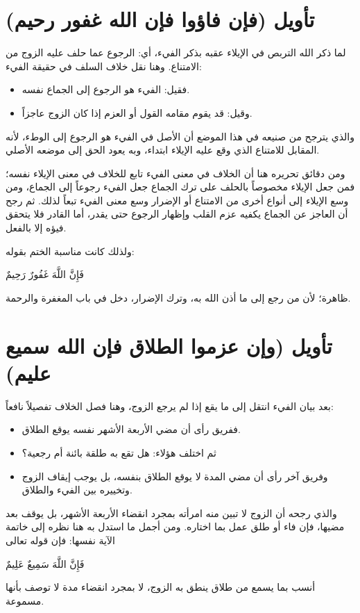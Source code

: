 \section{تأويل (فإن فاؤوا فإن الله غفور رحيم)}
لما ذكر الله التربص في الإيلاء عقبه بذكر الفيء، أي: الرجوع عما حلف عليه الزوج من الامتناع. وهنا نقل  خلاف السلف في حقيقة الفيء:
\begin{itemize}
    \item فقيل: الفيء هو الرجوع إلى الجماع نفسه.
    \item وقيل: قد يقوم مقامه القول أو العزم إذا كان الزوج عاجزاً.
\end{itemize}

والذي يترجح من صنيعه في هذا الموضع أن الأصل في الفيء هو الرجوع إلى الوطء، لأنه المقابل للامتناع الذي وقع عليه الإيلاء ابتداء، وبه يعود الحق إلى موضعه الأصلي.

ومن دقائق تحريره هنا أن الخلاف في معنى الفيء تابع للخلاف في معنى الإيلاء نفسه؛ فمن جعل الإيلاء مخصوصاً بالحلف على ترك الجماع جعل الفيء رجوعاً إلى الجماع، ومن وسع الإيلاء إلى أنواع أخرى من الامتناع أو الإضرار وسع معنى الفيء تبعاً لذلك. ثم رجح  أن العاجز عن الجماع يكفيه عزم القلب وإظهار الرجوع حتى يقدر، أما القادر فلا يتحقق فيؤه إلا بالفعل.

ولذلك كانت مناسبة الختم بقوله: \begin{ayah}فَإِنَّ اللَّهَ غَفُورٌ رَحِيمٌ\end{ayah} ظاهرة؛ لأن من رجع إلى ما أذن الله به، وترك الإضرار، دخل في باب المغفرة والرحمة.

\section{تأويل (وإن عزموا الطلاق فإن الله سميع عليم)}
بعد بيان الفيء انتقل  إلى ما يقع إذا لم يرجع الزوج، وهنا فصل الخلاف تفصيلاً نافعاً:
\begin{itemize}
    \item ففريق رأى أن مضي الأربعة الأشهر نفسه يوقع الطلاق.
    \item ثم اختلف هؤلاء: هل تقع به طلقة بائنة أم رجعية؟
    \item وفريق آخر رأى أن مضي المدة لا يوقع الطلاق بنفسه، بل يوجب إيقاف الزوج وتخييره بين الفيء والطلاق.
\end{itemize}

والذي رجحه  أن الزوج لا تبين منه امرأته بمجرد انقضاء الأربعة الأشهر، بل يوقف بعد مضيها، فإن فاء أو طلق عمل بما اختاره. ومن أجمل ما استدل به هنا نظره إلى خاتمة الآية نفسها: فإن قوله تعالى \begin{ayah}فَإِنَّ اللَّهَ سَمِيعٌ عَلِيمٌ\end{ayah} أنسب بما يسمع من طلاق ينطق به الزوج، لا بمجرد انقضاء مدة لا توصف بأنها مسموعة.

